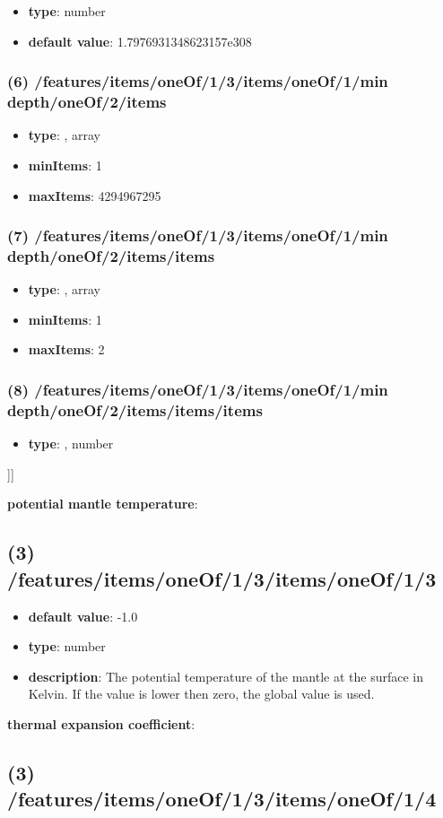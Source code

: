 \begin{itemize}[leftmargin=7em]\item {\bf type}: number\item {\bf default value}: 1.7976931348623157e308
\end{itemize}\subsubsection{(6) /features/items/oneOf/1/3/items/oneOf/1/min depth/oneOf/2/items}
\begin{itemize}[leftmargin=6em]\item {\bf type}: , array\item {\bf minItems}: 1
\item {\bf maxItems}: 4294967295
\end{itemize}\subsubsection{(7) /features/items/oneOf/1/3/items/oneOf/1/min depth/oneOf/2/items/items}
\begin{itemize}[leftmargin=7em]\item {\bf type}: , array\item {\bf minItems}: 1
\item {\bf maxItems}: 2
\end{itemize}\subsubsection{(8) /features/items/oneOf/1/3/items/oneOf/1/min depth/oneOf/2/items/items/items}
\begin{itemize}[leftmargin=8em]\item {\bf type}: , number\end{itemize}]]\item {\bf potential mantle temperature}: \subsection{(3) /features/items/oneOf/1/3/items/oneOf/1/3}
\begin{itemize}[leftmargin=3em]\item {\bf default value}: -1.0
\item {\bf type}: number
\item {\bf description}: The potential temperature of the mantle at the surface in Kelvin. If the value is lower then zero, the global value is used.
\end{itemize}\item {\bf thermal expansion coefficient}: \subsection{(3) /features/items/oneOf/1/3/items/oneOf/1/4}
